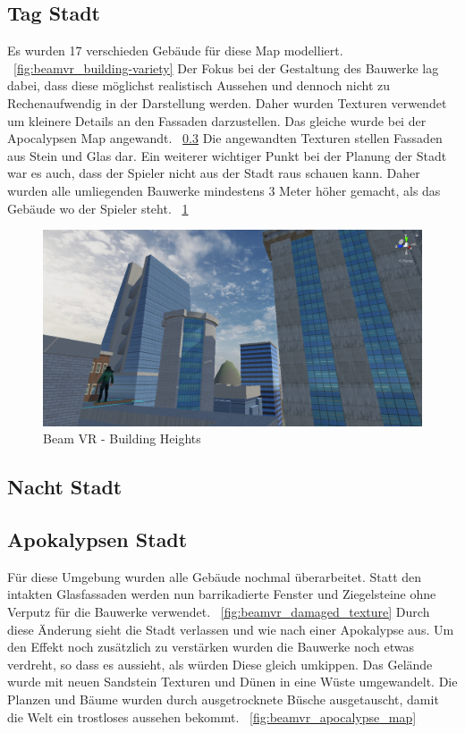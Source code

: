 \subsection{Tag Stadt}\label{subsec:day-city}
Es wurden 17 verschieden Geb\"aude f\"ur diese Map modelliert.
~\ref{fig:beamvr_building-variety}
Der Fokus bei der Gestaltung des Bauwerke lag dabei, dass diese m\"oglichst realistisch Aussehen und dennoch nicht zu Rechenaufwendig in der Darstellung werden.
Daher wurden Texturen verwendet um kleinere Details an den Fassaden darzustellen.
Das gleiche wurde bei der Apocalypsen Map angewandt.
~\ref{subsec:apocalypse-city}
Die angewandten Texturen stellen Fassaden aus Stein und Glas dar.
Ein weiterer wichtiger Punkt bei der Planung der Stadt war es auch, dass der Spieler nicht aus der Stadt raus schauen kann.
Daher wurden alle umliegenden Bauwerke mindestens 3 Meter h\"oher gemacht, als das Geb\"aude wo der Spieler steht.
~\ref{fig:beamvr_building-heights}

\begin {figure}
    \includegraphics[scale=0.18]{pics/beamvr_city_day_heights}
    \caption{Beam VR - Building Heights}
    \label{fig:beamvr_building-heights}
\end {figure}

\subsection{Nacht Stadt}\label{subsec:night-city}

\subsection{Apokalypsen Stadt}\label{subsec:apocalypse-city}
F\"ur diese Umgebung wurden alle Geb\"aude nochmal \"uberarbeitet.
Statt den intakten Glasfassaden werden nun barrikadierte Fenster und Ziegelsteine ohne Verputz f\"ur die Bauwerke verwendet.
~\ref{fig:beamvr_damaged_texture}
Durch diese \"Anderung sieht die Stadt verlassen und wie nach einer Apokalypse aus.
Um den Effekt noch zus\"atzlich zu verst\"arken wurden die Bauwerke noch etwas verdreht, so dass es aussieht, als w\"urden Diese gleich umkippen.
Das Gel\"ande wurde mit neuen Sandstein Texturen und D\"unen in eine W\"uste umgewandelt.
Die Planzen und B\"aume wurden durch ausgetrocknete B\"usche ausgetauscht, damit die Welt ein trostloses aussehen bekommt.
~\ref{fig:beamvr_apocalypse_map}

